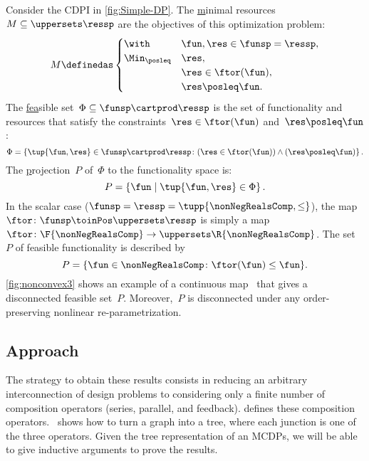 \begin{example}
    \label{exa:one}
    Consider the CDPI in \cref{fig:Simple-DP}.
    The \uline{m}inimal resources~$M\subseteq\uppersets \ressp$ are the objectives of this optimization problem:
    \begin{equation*}
        M\definedas\begin{cases}
                       \with & \fun,\res\in\funsp=\ressp,\\
                       \Min_{\posleq} & \res,\\
                       & \res\in\ftor(\fun),\\
                       & \res\posleq\fun.
        \end{cases}
    \end{equation*}
    The \uline{fea}sible %
    set~$\Phi\subseteq\funsp\cartprod\ressp$ is
    the set of functionality and resources that satisfy the constraints~$\res\in\ftor(\fun)$
    and~$\res\posleq\fun$:
    \begin{equation}
        \Phi=\left\{ \tup{\fun,\res}\in\funsp\cartprod\ressp\colon (\res\in\ftor(\fun))\wedge(\res\posleq\fun)\right\} .\label{eq:feasible}
    \end{equation}
    The \uline{p}rojection~$P$ of~$\Phi$ to the functionality space
    is:
    \begin{equation*}
        P=\left\{ \fun\mid\tup{\fun,\res} \in\Phi\right\}.
    \end{equation*}
    In the scalar case ($\funsp=\ressp=\tupp{\nonNegRealsComp,\leq}$),
    the map~$\ftor\colon\funsp\toinPos\uppersets \ressp$ is simply a map~$\ftor\colon\F{\nonNegRealsComp}\to \uppersets\R{\nonNegRealsComp}$.
    The set~$P$ of feasible functionality is described by
    \begin{equation}
        P=\{\fun\in\nonNegRealsComp\colon \ftor(\fun)\leq\fun\}.\label{eq:Pfeasible}
    \end{equation}
    \cref{fig:nonconvex3} shows an example of a continuous map~\ftor
    that gives a disconnected feasible set~$P$. Moreover,~$P$ is disconnected
    under any order-preserving nonlinear re-parametrization.

\end{example}

\subsection{Approach}

The strategy to obtain these results  consists in reducing an arbitrary
interconnection of design problems to considering only a finite
number of composition operators (series, parallel, and feedback).
 defines these composition operators. ~shows
how to turn a graph into a tree, where each junction is one of the
three operators. Given the tree representation of an MCDPs, we will
be able to give inductive arguments to prove the results.

